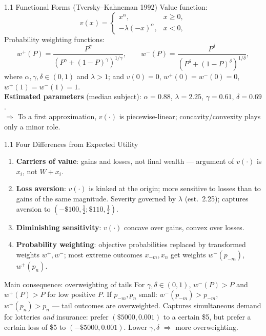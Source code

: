 \documentclass[aspectratio=169, 11pt]{beamer}
\begin{document}
\begin{frame}{1.1 Functional Forms (Tversky--Kahneman 1992)}
Value function:
\begin{equation}
v(x)=
\begin{cases}
x^{\alpha}, & x\ge 0,\\
-\lambda(-x)^{\alpha}, & x<0,
\end{cases}
\tag{5}
\end{equation}
Probability weighting functions:
\begin{equation}
w^{+}(P)=\frac{P^{\gamma}}{\left(P^{\gamma}+(1-P)^{\gamma}\right)^{1/\gamma}},
\qquad
w^{-}(P)=\frac{P^{\delta}}{\left(P^{\delta}+(1-P)^{\delta}\right)^{1/\delta}},
\tag{6}
\end{equation}
where $\alpha,\gamma,\delta\in(0,1)$ and $\lambda>1$; and $v(0)=0$, $w^{+}(0)=w^{-}(0)=0$, $w^{+}(1)=w^{-}(1)=1$.\\[1em]
\textbf{Estimated parameters} (median subject): $\alpha=0.88$, $\lambda=2.25$, $\gamma=0.61$, $\delta=0.69$.\\[0.5em]
$\Rightarrow$ To a first approximation, $v(\cdot)$ is \alert{piecewise-linear}; concavity/convexity plays only a minor role.
\end{frame}

\begin{frame}{1.1 Four Differences from Expected Utility}
\begin{enumerate}
  \item \textbf{Carriers of value}: gains and losses, not final wealth --- argument of $v(\cdot)$ is $x_i$, not $W+x_i$.
  \item \textbf{Loss aversion}: $v(\cdot)$ is \alert{kinked at the origin}; more sensitive to losses than to gains of the same magnitude. Severity governed by $\lambda$ (est.\ 2.25); captures aversion to $(-\$100,\tfrac12;\$110,\tfrac12)$.
  \item \textbf{Diminishing sensitivity}: $v(\cdot)$ concave over gains, \alert{convex over losses}.
  \item \textbf{Probability weighting}: objective probabilities replaced by transformed weights $w^{+},w^{-}$; most extreme outcomes $x_{-m},x_n$ get weights $w^{-}(p_{-m})$, $w^{+}(p_n)$.
\end{enumerate}
\vspace{0.5em}
\begin{block}{Main consequence: overweighting of tails}
For $\gamma,\delta\in(0,1)$, $w^{-}(P)>P$ and $w^{+}(P)>P$ for low positive $P$. If $p_{-m},p_n$ small: $w^{-}(p_{-m})>p_{-m}$, $w^{+}(p_n)>p_n$ --- tail outcomes are \alert{overweighted}. Captures simultaneous demand for lotteries \emph{and} insurance: prefer $(\$5000,0.001)$ to a certain \$5, but prefer a certain loss of \$5 to $(-\$5000,0.001)$. Lower $\gamma,\delta$ $\Rightarrow$ more overweighting.
\end{block}
\end{frame}
\end{document}
